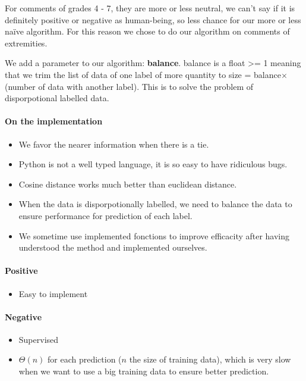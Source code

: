 \documentclass{article}
\begin{document}
For comments of grades 4 - 7, they are more or less neutral, we can't
say if it is definitely positive or negative as human-being, so less chance
for our more or less naïve algorithm. For this reason we chose
to do our algorithm on comments of extremities.

We add a parameter to our algorithm: \textbf{balance}.
balance is a float >= 1 meaning that we trim the list of data of one label
of more quantity to size = balance$\times$(number of data with another label).
This is to solve the problem of disporpotional labelled data.

\paragraph{On the implementation} \begin{itemize}
  \item We favor the nearer information when there is a tie.
  \item Python is not a well typed language, it is so easy to have
  ridiculous bugs.
  \item Cosine distance works much better than euclidean distance.
  \item When the data is disporpotionally labelled, we need to balance the data to ensure performance for prediction of each label.
  \item We sometime use implemented fonctions to improve
  efficacity after having understood the method and
  implemented ourselves.
\end{itemize}

\paragraph{Positive} \begin{itemize}
  \item Easy to implement
\end{itemize}

\paragraph{Negative} \begin{itemize}
  \item Supervised
  \item $\Theta(n)$ for each prediction ($n$ the size of training data), which is
  very slow when we want to use a big training data to ensure better prediction.
\end{itemize}
\end{document}
